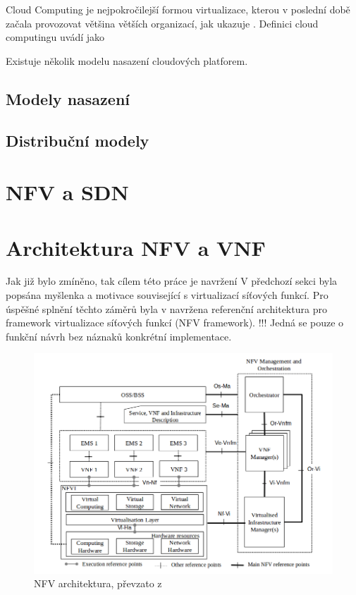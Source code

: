 Cloud Computing je nejpokročilejší formou virtualizace, kterou v poslední době začala provozovat většina větších organizací, jak ukazuje \cite{Cloud_adoption}. Definici cloud computingu uvádí \cite{Cloud_definice} jako 

Existuje několik modelu nasazení cloudových platforem.

\subsection{Modely nasazení}

\subsection{Distribuční modely}


\section{NFV a SDN}

\section{Architektura NFV a VNF}

Jak již bylo zmíněno, tak cílem této práce je navržení 
V předchozí sekci byla popsána myšlenka a motivace související s virtualizací síťových funkcí. Pro úspěšné splnění těchto záměrů byla v \cite{NFV_architektura} navržena referenční architektura pro framework virtualizace síťových funkcí (NFV framework). !!! Jedná se pouze o funkční návrh bez náznaků konkrétní implementace. 

\begin{figure}[h]
\begin{centering}
\includegraphics[scale=0.5]{images/NFV_architektura}
\par\end{centering}
\caption{NFV architektura, převzato z \cite{NFV_architektura}\label{fig:NFV_architektura}}
\end{figure}

